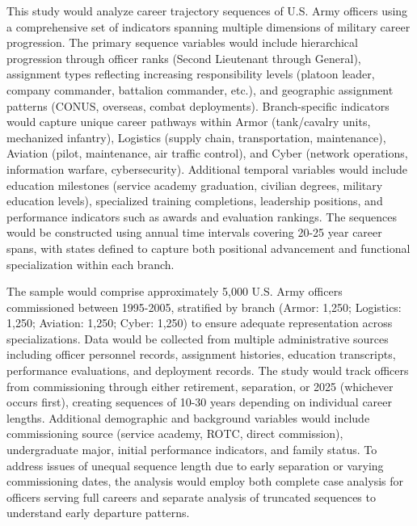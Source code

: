 \documentclass[../main.tex]{subfiles}
\begin{document}
This study would analyze career trajectory sequences of U.S. Army officers using a comprehensive set of indicators spanning multiple dimensions of military career progression. The primary sequence variables would include hierarchical progression through officer ranks (Second Lieutenant through General), assignment types reflecting increasing responsibility levels (platoon leader, company commander, battalion commander, etc.), and geographic assignment patterns (CONUS, overseas, combat deployments). Branch-specific indicators would capture unique career pathways within Armor (tank/cavalry units, mechanized infantry), Logistics (supply chain, transportation, maintenance), Aviation (pilot, maintenance, air traffic control), and Cyber (network operations, information warfare, cybersecurity). Additional temporal variables would include education milestones (service academy graduation, civilian degrees, military education levels), specialized training completions, leadership positions, and performance indicators such as awards and evaluation rankings. The sequences would be constructed using annual time intervals covering 20-25 year career spans, with states defined to capture both positional advancement and functional specialization within each branch.


The sample would comprise approximately 5,000 U.S. Army officers commissioned between 1995-2005, stratified by branch (Armor: 1,250; Logistics: 1,250; Aviation: 1,250; Cyber: 1,250) to ensure adequate representation across specializations. Data would be collected from multiple administrative sources including officer personnel records, assignment histories, education transcripts, performance evaluations, and deployment records. The study would track officers from commissioning through either retirement, separation, or 2025 (whichever occurs first), creating sequences of 10-30 years depending on individual career lengths. Additional demographic and background variables would include commissioning source (service academy, ROTC, direct commission), undergraduate major, initial performance indicators, and family status. To address issues of unequal sequence length due to early separation or varying commissioning dates, the analysis would employ both complete case analysis for officers serving full careers and separate analysis of truncated sequences to understand early departure patterns.

\end{document}

